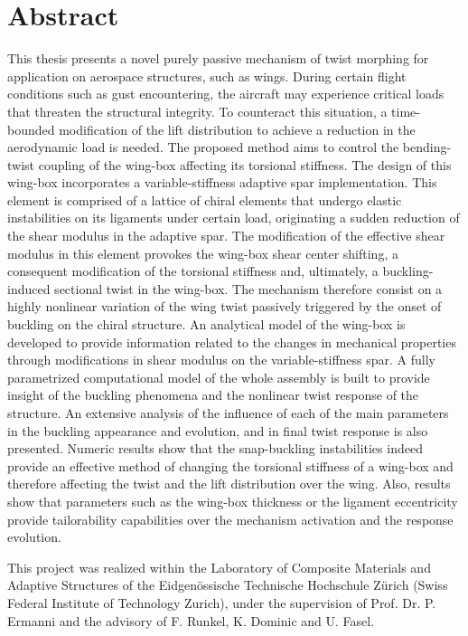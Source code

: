 \section*{Abstract}

This thesis presents a novel purely passive mechanism of twist morphing for application on aerospace structures, such as wings. During certain flight conditions such as gust encountering, the aircraft may experience critical loads that threaten the structural integrity. To counteract this situation, a time-bounded modification of the lift distribution to achieve a reduction in the aerodynamic load is needed. The proposed method aims to control the bending-twist coupling of the wing-box affecting its torsional stiffness. The design of this wing-box incorporates a variable-stiffness adaptive spar implementation. This element is comprised of a lattice of chiral elements that undergo elastic instabilities on its ligaments under certain load, originating a sudden reduction of the shear modulus in the adaptive spar. The modification of the effective shear modulus in this element provokes the wing-box shear center shifting, a consequent modification of the torsional stiffness and, ultimately, a buckling-induced sectional twist in the wing-box. The mechanism therefore consist on a highly nonlinear variation of the wing twist passively triggered by the onset of buckling on the chiral structure. An analytical model of the wing-box is developed to provide information related to the changes in mechanical properties through modifications in shear modulus on the variable-stiffness spar. A fully parametrized computational model of the whole assembly is built to provide insight of the buckling phenomena and the nonlinear twist response of the structure. An extensive analysis of the influence of each of the main parameters in the buckling appearance and evolution, and in final twist response is also presented. Numeric results show that the snap-buckling instabilities indeed provide an effective method of changing the torsional stiffness of a wing-box and therefore affecting the twist and the lift distribution over the wing. Also, results show that parameters such as the wing-box thickness or the ligament eccentricity provide tailorability capabilities over the mechanism activation and the response evolution.



\vfill
\normalsize
\noindent
This project was realized within the Laboratory of Composite Materials and Adaptive Structures of the Eidgen\"ossische Technische Hochschule Z\"urich (Swiss Federal Institute of Technology Zurich), under the supervision of Prof. Dr. P. Ermanni and the advisory of F. Runkel, K. Dominic and U. Fasel.